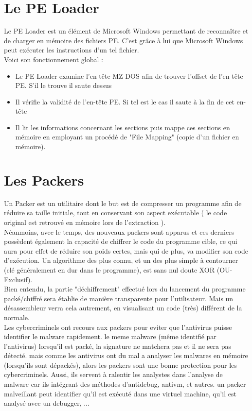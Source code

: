 \section{Le PE Loader}
Le PE Loader est un élément de Microsoft Windows permettant de reconnaître et de charger en mémoire des fichiers PE. C'est grâce à lui que Microsoft Windows peut exécuter les instructions d'un tel fichier.\\


Voici son fonctionnement global :
\begin{itemize}
\item Le PE Loader examine l'en-tête MZ-DOS afin de trouver l'offset de l'en-tête PE. S'il le trouve il saute dessus
\item Il vérifie la validité de l'en-tête PE. Si tel est le cas il saute à la fin de cet en-tête
\item Il lit les informations concernant les sections puis mappe ces sections en mémoire en employant un procédé de "File Mapping" (copie d'un fichier en mémoire).

\end{itemize}
        
\section{Les Packers}
Un Packer est un utilitaire dont le but est de compresser un programme afin de réduire sa taille initiale, tout en conservant son aspect exécutable ( le code original est retrouvé en mémoire lors de l'extraction ).\\
Néanmoins, avec le temps, des nouveaux packers sont apparus et ces derniers possèdent également la capacité de chiffrer le code du programme cible, ce qui aura pour effet de réduire son poids certes, mais qui de plus, va modifier son code d'exécution. Un algorithme des plus connu, et un des plus simple à contourner (clé généralement en dur dans le programme), est sans nul doute XOR (OU-Exclusif).\\
Bien entendu, la partie "déchiffrement" effectué lors du lancement du programme packé/chiffré sera établie de manière transparente pour l'utilisateur. Mais un désassembleur  verra cela autrement, en visualisant un code (très) différent de la normale.\\

Les cybercriminels ont recours aux packers pour eviter que l'antivirus puisse identifier le malware rapidement. le meme malware (même identifié par l'antivirus) lorsqu'il est packé, la signature ne matchera pas et il ne sera pas détecté. mais comme les antivirus ont du mal a analyser les malwares en mémoire (lorsqu'ils sont dépackés), alors les packers sont une bonne protection pour les cybercriminels. Aussi, ils servent à ralentir les analystes dans l'analyse de malware car ils intégrant des méthodes d'antidebug, antivm, et autres.
un packer malveillant peut identifier qu'il est exécuté dans une virtuel machine, qu'il est analysé avec un debugger, ...\\

